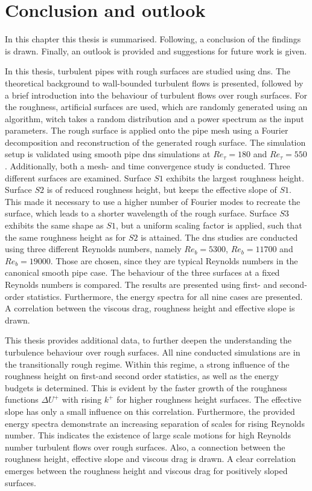\chapter{Conclusion and outlook}\label{chap: Conclusion}

In this chapter this thesis is summarised.
Following, a conclusion of the findings is drawn.
Finally, an outlook is provided and suggestions for future work is given.

In this thesis, turbulent pipes with rough surfaces are studied using \acrfull{dns}.
The theoretical background to wall-bounded turbulent flows is presented, followed by a brief introduction into the behaviour of turbulent flows over rough surfaces.
For the roughness, artificial surfaces are used, which are randomly generated using an algorithm, witch takes a random distribution and a power spectrum as the input parameters.
The rough surface is applied onto the pipe mesh using a Fourier decomposition and reconstruction of the generated rough surface.
The simulation setup is validated using smooth pipe \acrshort{dns} simulations at $Re_\tau = 180$ and $Re_\tau = 550$.
Additionally, both a mesh- and time convergence study is conducted.
Three different surfaces are examined.
Surface $S1$ exhibits the largest roughness height.
Surface $S2$ is of reduced roughness height, but keeps the effective slope of $S1$.
This made it necessary to use a higher number of Fourier modes to recreate the surface, which leads to a shorter wavelength of the rough surface.
Surface $S3$ exhibits the same shape as $S1$, but a uniform scaling factor is applied, such that the same roughness height as for $S2$ is attained.
The \acrshort{dns} studies are conducted using three different Reynolds numbers, namely $Re_b = 5300$, $Re_b = 11700$ and $Re_b = 19000$.
Those are chosen, since they are typical Reynolds numbers in the canonical smooth pipe case.
The behaviour of the three surfaces at a fixed Reynolds numbers is compared.
The results are presented using first- and second-order statistics.
Furthermore, the energy spectra for all nine cases are presented.
A correlation between the viscous drag, roughness height and effective slope is drawn.

This thesis provides additional data, to further deepen the understanding the turbulence behaviour over rough surfaces.
All nine conducted simulations are in the transitionally rough regime.
Within this regime, a strong influence of the roughness height on first-and second order statistics, as well as the energy budgets is determined.
This is evident by the faster growth of the roughness functions $\Delta U^+$ with rising $k^+$ for higher roughness height surfaces.
The effective slope has only a small influence on this correlation. 
Furthermore, the provided energy spectra demonstrate an increasing separation of scales for rising Reynolds number.
This indicates the existence of large scale motions for high Reynolds number turbulent flows over rough surfaces.
Also, a connection between the roughness height, effective slope and viscous drag is drawn.
A clear correlation emerges between the roughness height and viscous drag for positively sloped surfaces.

